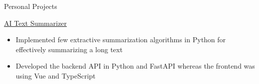 \documentclass{article}
\newlength{\tabin}
\newlength{\secsep}
\newcommand{\lineunder}{\vspace*{-8pt} \\ \hspace*{-6pt} \hrulefill \\ \vspace*{-15pt}}
\newenvironment{tabbedsection}[1]{
  \begin{list}{}{
      \setlength{\itemsep}{0pt}
      \setlength{\labelsep}{0pt}
      \setlength{\labelwidth}{0pt}
      \setlength{\leftmargin}{\tabin}
      \setlength{\rightmargin}{\tabin}
      \setlength{\listparindent}{0pt}
      \setlength{\parsep}{0pt}
      \setlength{\parskip}{0pt}
      \setlength{\partopsep}{0pt}
      \setlength{\topsep}{#1}
    }
  \item[]
}{\end{list}}
\newenvironment{resume_section}[1]{
  \filbreak
  \vspace{2\secsep}
  \textsc{\large#1}
  \lineunder
  \begin{tabbedsection}{\secsep}
}{\end{tabbedsection}}
\newenvironment{resume_subsection}[2][]{
  \textbf{#2} \hfill {\footnotesize #1} \hspace{2em}
  \begin{tabbedsection}{0.5\secsep}
}{\end{tabbedsection}}
\newenvironment{subitems}{
  \renewcommand{\labelitemi}{-}
  \begin{itemize}
      \setlength{\labelsep}{1em}
}{\end{itemize}}
\begin{document}
\begin{resume_section}{Personal Projects}



  \begin{resume_subsection}{\href{https://github.com/marcustut/summarize}{AI Text Summarizer}}
    \begin{subitems}
      \item Implemented few extractive summarization algorithms in Python for effectively summarizing a long text
      \item Developed the backend API in Python and FastAPI whereas the frontend was using Vue and TypeScript
    \end{subitems}
  \end{resume_subsection}


\end{resume_section}
\end{document}
